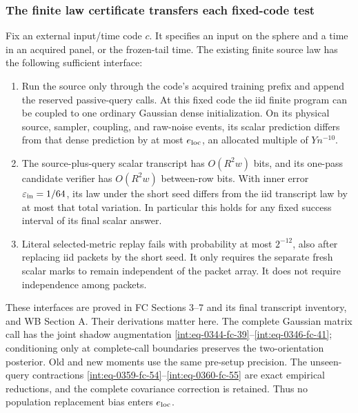 \subsubsection{The finite law certificate transfers each fixed-code test}



Fix an external input/time code \(c\). It specifies an input on the sphere and a time in an acquired panel, or the frozen-tail time. The existing finite source law has the following sufficient interface:


\begin{enumerate}
\item[1.] Run the source only through the code's acquired training prefix and append the reserved passive-query calls. At this fixed code the iid finite program can be coupled to one ordinary Gaussian dense initialization. On its physical source, sampler, coupling, and raw-noise events, its scalar prediction differs from that dense prediction by at most \(e_{\rm loc}\), an allocated multiple of \(Yn^{-10}\).
\item[2.] The source-plus-query scalar transcript has \(O(R^2w)\) bits, and its one-pass candidate verifier has \(O(R^2w)\) between-row bits. With inner error \(\varepsilon_{\rm in}=1/64\), its law under the short seed differs from the iid transcript law by at most that total variation. In particular this holds for any fixed success interval of its final scalar answer.
\item[3.] Literal selected-metric replay fails with probability at most \(2^{-12}\), also after replacing iid packets by the short seed. It only requires the separate fresh scalar marks to remain independent of the packet array. It does not require independence among packets.
\end{enumerate}


These interfaces are proved in FC Sections 3--7 and its final transcript inventory, and WB Section A. Their derivations matter here. The complete Gaussian matrix call has the joint shadow augmentation \eqref{int:eq-0344-fc-39}--\allowbreak \eqref{int:eq-0346-fc-41}; conditioning only at complete-call boundaries preserves the two-orientation posterior. Old and new moments use the same pre-setup precision. The unseen-query contractions \eqref{int:eq-0359-fc-54}--\allowbreak \eqref{int:eq-0360-fc-55} are exact empirical reductions, and the complete covariance correction is retained. Thus no population replacement bias enters \(e_{\rm loc}\).


